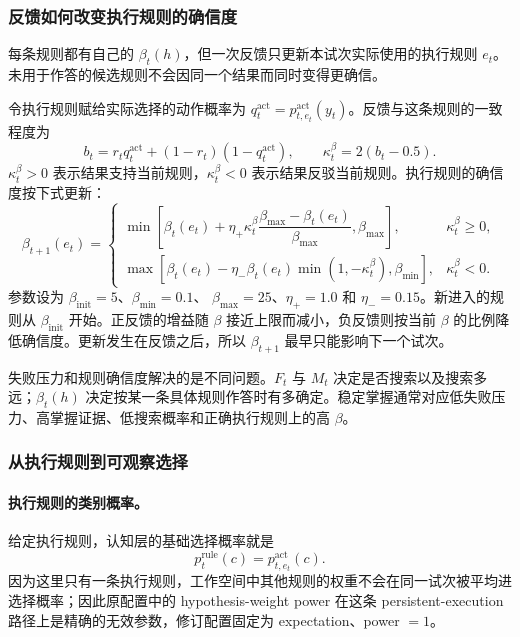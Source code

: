 \subsubsection{反馈如何改变执行规则的确信度}

每条规则都有自己的 $\beta_t(h)$，但一次反馈只更新本试次实际使用的执行规则 $e_t$。未用于作答的候选规则不会因同一个结果而同时变得更确信。

令执行规则赋给实际选择的动作概率为
$q_t^{\mathrm{act}}=p^{\mathrm{act}}_{t,e_t}(y_t)$。反馈与这条规则的一致程度为
\begin{equation}
b_t=r_tq_t^{\mathrm{act}}+(1-r_t)(1-q_t^{\mathrm{act}}),
\qquad
\kappa_t^{\beta}=2(b_t-0.5).
\label{eq:dynamic-beta-evidence}
\end{equation}
$\kappa_t^{\beta}>0$ 表示结果支持当前规则，$\kappa_t^{\beta}<0$ 表示结果反驳当前规则。执行规则的确信度按下式更新：
\begin{equation}
\beta_{t+1}(e_t)=
\begin{cases}
\min\!\left[
\beta_t(e_t)+\eta_+\kappa_t^{\beta}
\dfrac{\beta_{\max}-\beta_t(e_t)}{\beta_{\max}},
\beta_{\max}\right],
&\kappa_t^{\beta}\geq0,
\\[7pt]
\max\!\left[
\beta_t(e_t)-\eta_-\beta_t(e_t)
\min(1,-\kappa_t^{\beta}),
\beta_{\min}\right],
&\kappa_t^{\beta}<0.
\end{cases}
\label{eq:dynamic-beta-update}
\end{equation}
参数设为 $\beta_{\mathrm{init}}=5$、$\beta_{\min}=0.1$、
$\beta_{\max}=25$、$\eta_+=1.0$ 和 $\eta_-=0.15$。新进入的规则从
$\beta_{\mathrm{init}}$ 开始。正反馈的增益随 $\beta$ 接近上限而减小，负反馈则按当前 $\beta$ 的比例降低确信度。更新发生在反馈之后，所以 $\beta_{t+1}$ 最早只能影响下一个试次。

失败压力和规则确信度解决的是不同问题。$F_t$ 与 $M_t$ 决定是否搜索以及搜索多远；$\beta_t(h)$ 决定按某一条具体规则作答时有多确定。稳定掌握通常对应低失败压力、高掌握证据、低搜索概率和正确执行规则上的高 $\beta$。


\subsubsection{从执行规则到可观察选择}

\paragraph{执行规则的类别概率。}
给定执行规则，认知层的基础选择概率就是
\begin{equation}
p_t^{\mathrm{rule}}(c)=p^{\mathrm{act}}_{t,e_t}(c).
\label{eq:dynamic-executed-choice}
\end{equation}
因为这里只有一条执行规则，工作空间中其他规则的权重不会在同一试次被平均进选择概率；因此原配置中的 hypothesis-weight power 在这条 persistent-execution 路径上是精确的无效参数，修订配置固定为 expectation、power $=1$。

